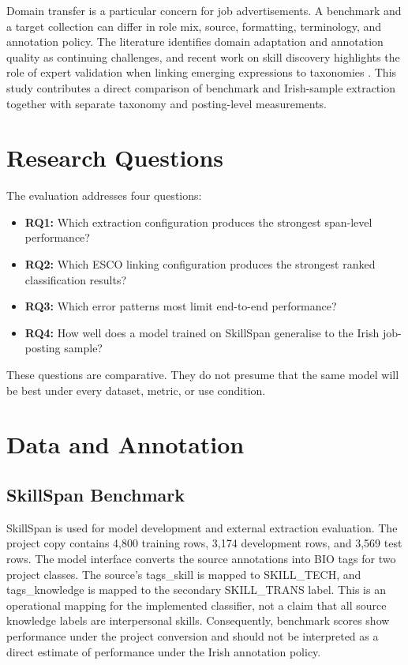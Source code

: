\documentclass[conference]{IEEEtran}
\begin{document}
Domain transfer is a particular concern for job advertisements. A benchmark and a target collection can differ in role mix, source, formatting, terminology, and annotation policy. The literature identifies domain adaptation and annotation quality as continuing challenges, and recent work on skill discovery highlights the role of expert validation when linking emerging expressions to taxonomies \cite{Napierala2024,DeSanto2026,Panzaru2025}. This study contributes a direct comparison of benchmark and Irish-sample extraction together with separate taxonomy and posting-level measurements.

\section{Research Questions}
The evaluation addresses four questions:
\begin{itemize}
  \item \textbf{RQ1:} Which extraction configuration produces the strongest span-level performance?
  \item \textbf{RQ2:} Which ESCO linking configuration produces the strongest ranked classification results?
  \item \textbf{RQ3:} Which error patterns most limit end-to-end performance?
  \item \textbf{RQ4:} How well does a model trained on SkillSpan generalise to the Irish job-posting sample?
\end{itemize}
These questions are comparative. They do not presume that the same model will be best under every dataset, metric, or use condition.

\section{Data and Annotation}
\subsection{SkillSpan Benchmark}
SkillSpan is used for model development and external extraction evaluation. The project copy contains 4,800 training rows, 3,174 development rows, and 3,569 test rows. The model interface converts the source annotations into BIO tags for two project classes. The source's \textsf{tags\_skill} is mapped to \textsf{SKILL\_TECH}, and \textsf{tags\_knowledge} is mapped to the secondary \textsf{SKILL\_TRANS} label. This is an operational mapping for the implemented classifier, not a claim that all source knowledge labels are interpersonal skills. Consequently, benchmark scores show performance under the project conversion and should not be interpreted as a direct estimate of performance under the Irish annotation policy.
\end{document}
